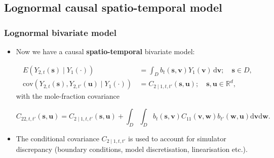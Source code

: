 \documentclass{beamer}
\newcommand{\s}{\mathbf{s}}
\renewcommand{\v}{\mathbf{v}}
\renewcommand{\u}{\mathbf{u}}
\newcommand{\w}{\mathbf{w}}
\renewcommand{\d}{\mathrm{d}}
\newcommand{\E}{E}
\newcommand{\cov}{\mathrm{cov}}
\begin{document}
\subsection{Lognormal causal spatio-temporal model}

\begin{frame}
\frametitle{Lognormal bivariate model}

\begin{itemize}

\item Now we have a causal {\bf spatio-temporal} bivariate model:

\begin{align*}
\E\left(Y_{2,t}(\s)\mid Y_1(\cdot)\right)&\,=\int_D{b_t(\s,\v)Y_1(\v)\,\d \v};\quad \s\in D,\\
\cov\left(Y_{2,t}(\s),Y_{2,t'}(\u)\mid Y_1(\cdot)\right)&\,=C_{2\mid 1,t,t'}(\s,\u);\quad \s,\u\in \mathbb{R}^d,
\end{align*}
with the mole-fraction covariance

\begin{equation*}
C_{22,t,t'}(\s,\u) = C_{2\mid 1,t,t'}(\s,\u)+\int_D\int_D {b_t(\s,\v)} {C_{11}(\v,\w)} {b_{t'}(\w,\u)}\d\v\d\w.
\end{equation*}

\item The conditional covariance $C_{2\mid 1,t,t'}$ is used to account for simulator discrepancy (boundary conditions, model discretisation, linearisation etc.).

\end{itemize}

\end{frame}
\end{document}
